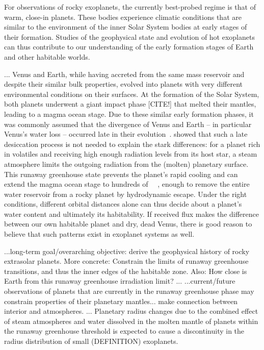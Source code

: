 \documentclass[twocolumn]{aastex631}
\begin{document}
\begin{note}
For observations of rocky exoplanets, the currently best-probed regime is that of warm, close-in planets.
These bodies experience climatic conditions that are similar to the environment of the inner Solar System bodies at early stages of their formation.
Studies of the geophysical state and evolution of hot exoplanets can thus contribute to our understanding of the early formation stages of Earth and other habitable worlds.

...
    Venus and Earth, while having accreted from the same mass reservoir and despite their similar bulk properties, evolved into planets with very different environmental conditions on their surfaces.
    At the formation of the Solar System, both planets underwent a giant impact phase [CITE!] that melted their mantles, leading to a magma ocean stage.
    Due to these similar early formation phases, it was commonly assumed that the divergence of Venus and Earth -- in particular Venus's water loss -- occurred late in their evolution~\citep{Elkins-Tanton2013}.
    \citet{Hamano2013} showed that such a late desiccation process is not needed to explain the stark differences: for a planet rich in volatiles and receiving high enough radiation levels from its host star, a steam atmosphere limits the outgoing radiation from the (molten) planetary surface.
    This runaway greenhouse state prevents the planet's rapid cooling and can extend the magma ocean stage to hundreds of \SI{}{\mega\year}, enough to remove the entire water reservoir from a rocky planet by hydrodynamic escape.
    Under the right conditions, different orbital distances alone can thus decide about a planet's water content and ultimately its habitability.
    If received flux makes the difference between our own habitable planet and dry, dead Venus, there is good reason to believe that such patterns exist in exoplanet systems as well.

    ...long-term goal/overarching objective: derive the geophysical history of rocky extrasolar planets. More concrete: Constrain the limits of runaway greenhouse transitions, and thus the inner edges of the habitable zone. Also: How close is Earth from this runaway greenhouse irradiation limit?
   ...
    ...current/future observations of planets that are currently in the runaway greenhouse phase may constrain properties of their planetary mantles... make connection between interior and atmospheres.
    ...
    Planetary radius changes due to the combined effect of steam atmospheres and water dissolved in the molten mantle of planets within the runaway greenhouse threshold is expected to cause a discontinuity in the radius distribution of small (DEFINITION) exoplanets.
\end{note}
\end{document}
